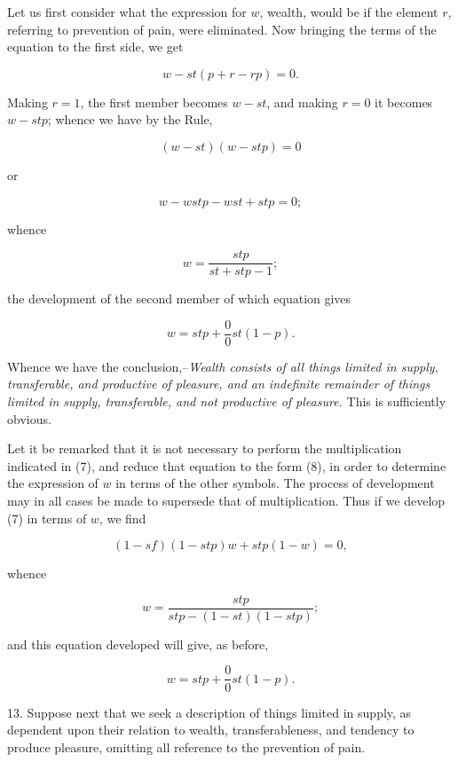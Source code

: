 \documentclass[oneside]{book}
\begin{document}
Let us first consider what the expression for $w$, wealth, would
be if the element $r$, referring to prevention of pain, were
eliminated. Now bringing the terms of the equation to the first side,
we get

\[
w - st(p+r-rp) = 0.
\]

Making $r = 1$, the first member becomes $w - st$, and making
$r = 0$ it becomes $w - stp$; whence we have by the Rule,

\begin{equation}
(w-st)(w-stp)=0
\end{equation}

or

\begin{equation}
w-wstp - wst + stp = 0;
\end{equation}

whence

\[
w = \frac{stp}{st + stp - 1};
\]

the development of the second member of which equation gives

\begin{equation}
w = stp + \frac{0}{0}st (1 - p).
\end{equation}

Whence we have the conclusion,--\textit{Wealth consists of all things
limited in supply, transferable, and productive of pleasure, and an
indefinite remainder of things limited in supply, transferable, and
not productive of pleasure.} This is sufficiently obvious.

Let it be remarked that it is not necessary to perform the
multiplication indicated in (7), and reduce that equation to the
form (8), in order to determine the expression of $w$ in terms of
the other symbols. The process of development may in all cases
be made to supersede that of multiplication. Thus if we
develop (7) in terms of $w$, we find

\[
(1 - sf) (1 - stp)w + stp(1 - w) = 0,
\]

whence

\[
w=\frac{stp}{stp -(1-st)(1-stp)};
\]

and this equation developed will give, as before,

\[
w = stp + \frac{0}{0} st(1 - p).
\]

13. Suppose next that we seek a description of things limited
in supply, as dependent upon their relation to wealth,
transferableness, and tendency to produce pleasure, omitting all reference to
the prevention of pain.
\end{document}
